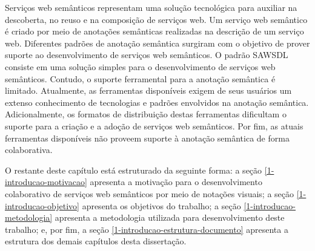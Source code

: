 Serviços web semânticos representam uma solução tecnológica para auxiliar na descoberta, no reuso e na composição de serviços web. Um serviço web semântico é criado por meio de anotações semânticas realizadas na descrição de um serviço web. Diferentes padrões de anotação semântica surgiram com o objetivo de prover suporte ao desenvolvimento de serviços web semânticos. O padrão SAWSDL consiste em uma solução simples para o desenvolvimento de serviços web semânticos. Contudo, o suporte ferramental para a anotação semântica é limitado. Atualmente, as ferramentas disponíveis exigem de seus usuários um extenso conhecimento de tecnologias e padrões envolvidos na anotação semântica. Adicionalmente, os formatos de distribuição destas ferramentas dificultam o suporte para a criação e a adoção de serviços web semânticos. Por fim, as atuais ferramentas disponíveis não proveem suporte à anotação semântica de forma colaborativa.

O restante deste capítulo está estruturado da seguinte forma: a seção \ref{1-introducao-motivacao} apresenta a motivação para o desenvolvimento colaborativo de serviços web semânticos por meio de notações visuais; a seção \ref{1-introducao-objetivo} apresenta os objetivos do trabalho; a seção \ref{1-introducao-metodologia} apresenta a metodologia utilizada para desenvolvimento deste trabalho; e, por fim, a seção \ref{1-introducao-estrutura-documento} apresenta a estrutura dos demais capítulos desta dissertação.